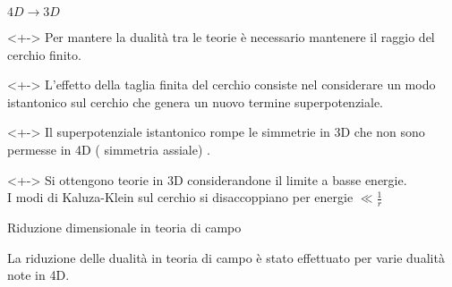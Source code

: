 \documentclass[10pt,compress]{beamer}
\begin{document}
\begin{frame}{$4D \rightarrow 3D$ }
\begin{block}{}<+->
Per mantere la dualità tra le teorie è necessario mantenere il raggio del cerchio finito.\\
\end{block}
\begin{block}{}<+->
L'effetto della taglia finita del cerchio consiste nel considerare un modo istantonico sul cerchio che genera un nuovo termine superpotenziale.
\end{block}
\begin{block}{}<+->
Il superpotenziale istantonico rompe le simmetrie in 3D che non sono permesse in 4D ( simmetria assiale) . 
\end{block}

\begin{block}{}<+->
Si ottengono teorie in 3D considerandone il limite a basse energie.\\
I modi di Kaluza-Klein sul cerchio si disaccoppiano per energie $\ll \frac{1}{r}$
\end{block}

\end{frame}

\begin{frame}{Riduzione dimensionale in teoria di campo}
\begin{block}{}
La riduzione delle dualità in teoria di campo è stato effettuato per varie dualità note in 4D.\\

\end{block}

\end{frame}







\nocite{*}
%

\end{document}
